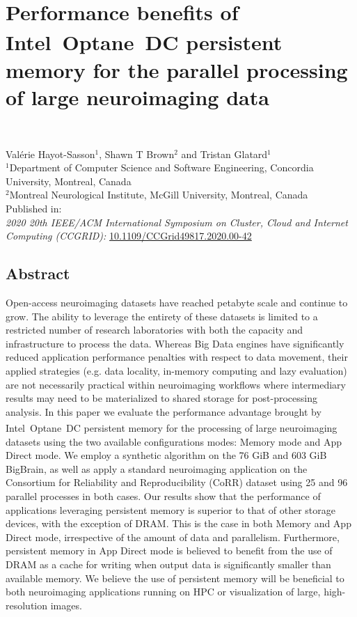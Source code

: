 \chapter{Performance benefits of
Intel\textsuperscript{\textregistered}~Optane\texttrademark~DC persistent memory
for the parallel processing of large neuroimaging data}~\label{chp:optane}

Val\'erie Hayot-Sasson$^1$, Shawn T Brown$^2$ and Tristan Glatard$^1$\\
\begingroup \footnotesize $^1$Department of Computer Science and Software
Engineering, Concordia University, Montreal, Canada\\
$^2$Montreal Neurological Institute, McGill University, Montreal, Canada
\endgroup
\vspace{5pt} \\
Published in: \\
\hspace*{10pt} \textit{2020 20th IEEE/ACM International Symposium on Cluster,
Cloud and Internet Computing (CCGRID):} \url{10.1109/CCGrid49817.2020.00-42}

\section{Abstract}
    Open-access neuroimaging datasets have reached petabyte scale and continue
to grow. The ability to leverage the entirety of these datasets is limited to a
restricted number of research laboratories with both the capacity and
infrastructure to process the data. Whereas Big Data engines have significantly
reduced application performance penalties with respect to data movement, their
applied strategies (e.g. data locality, in-memory computing and lazy evaluation)
are not necessarily practical within neuroimaging workflows where intermediary
results may need to be materialized to shared storage for post-processing
analysis. In this paper we evaluate the performance advantage brought by
Intel\textsuperscript{\textregistered}~Optane\texttrademark~DC persistent memory
for the processing of large neuroimaging datasets using the two available
configurations modes: Memory mode and App Direct mode. We employ a synthetic
algorithm on the 76 GiB and 603 GiB BigBrain, as well as apply a standard
neuroimaging application on the Consortium for Reliability and Reproducibility
(CoRR) dataset using 25 and 96 parallel processes in both cases. Our results
show that the performance of applications leveraging persistent memory is
superior to that of other storage devices, with the exception of DRAM. This is
the case in both Memory and App Direct mode, irrespective of the amount of data
and parallelism. Furthermore, persistent memory in App Direct mode is believed
to benefit from the use of DRAM as a cache for writing when output data is
significantly smaller than available memory. We believe the use of persistent
memory will be beneficial to both neuroimaging applications running on HPC or
visualization of large, high-resolution images.

